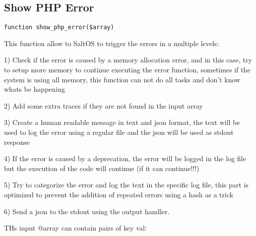 \documentclass[a4paper]{book}
\begin{document}
\hypertarget{toc100}{}
\subsection{Show PHP Error}

\begin{lstlisting}
function show_php_error($array)
\end{lstlisting}

This function allow to SaltOS to trigger the errors in a multiple levels:

1) Check if the error is caused by a memory allocation error, and in this case, try
to setup more memory to continue executing the error function, sometimes if the system
is using all memory, this function can not do all tasks and don't know whats be happening

2) Add some extra traces if they are not found in the input array

3) Create a human readable message in text and json format, the text will be used
to log the error using a regular file and the json will be used as stdout response

4) If the error is caused by a deprecation, the error will be logged in the log file
but the execution of the code will continue (if it can continue!!!)

5) Try to categorize the error and log the text in the specific log file, this part
is optimized to prevent the addition of repeated errors using a hash as a trick

6) Send a json to the stdout using the output handler.

THs input @array can contain pairs of key val:
\end{document}
